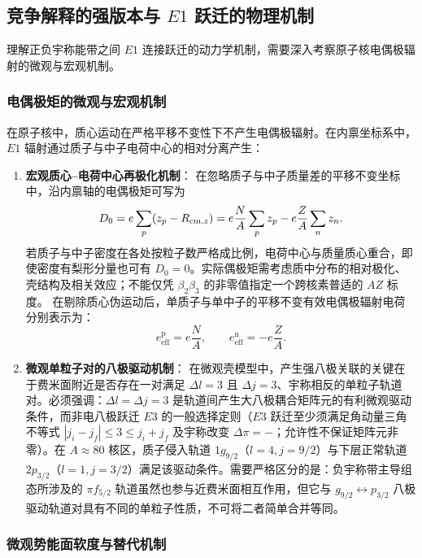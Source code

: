 \subsection{竞争解释的强版本与 $E1$ 跃迁的物理机制}\label{sec:4-5-4}

理解正负宇称能带之间 $E1$ 连接跃迁的动力学机制，需要深入考察原子核电偶极辐射的微观与宏观机制。

\subsubsection{电偶极矩的微观与宏观机制}

在原子核中，质心运动在严格平移不变性下不产生电偶极辐射。在内禀坐标系中，$E1$ 辐射通过质子与中子电荷中心的相对分离产生：
\begin{enumerate}
\item \textbf{宏观质心--电荷中心再极化机制}：
在忽略质子与中子质量差的平移不变坐标中，沿内禀轴的电偶极矩可写为
\begin{equation}\label{eq:4-5-myers-dipole}
D_0=e\sum_{p}(z_p-R_{{\rm cm},z})
=e\frac{N}{A}\sum_p z_p-e\frac{Z}{A}\sum_n z_n.
\end{equation}
若质子与中子密度在各处按粒子数严格成比例，电荷中心与质量质心重合，即使密度有梨形分量也可有 $D_0=0$。实际偶极矩需考虑质中分布的相对极化、壳结构及相关效应；不能仅凭 $\beta_2\beta_3$ 的非零值指定一个跨核素普适的 $AZ$ 标度。
在剔除质心伪运动后，单质子与单中子的平移不变有效电偶极辐射电荷分别表示为：
\begin{equation}\label{eq:4-5-effective-charge}
e_{\text{eff}}^{\text{p}} = e \frac{N}{A}, \qquad e_{\text{eff}}^{\text{n}} = -e \frac{Z}{A}.
\end{equation}
\item \textbf{微观单粒子对的八极驱动机制}：
在微观壳模型中，产生强八极关联的关键在于费米面附近是否存在一对满足 $\Delta l = 3$ 且 $\Delta j = 3$、宇称相反的单粒子轨道对。必须强调：$\Delta l = \Delta j = 3$ 是轨道间产生大八极耦合矩阵元的有利微观驱动条件，而非电八极跃迁 $E3$ 的一般选择定则（$E3$ 跃迁至少须满足角动量三角不等式 $|j_i - j_f| \le 3 \le j_i + j_f$ 及宇称改变 $\Delta\pi=-$；允许性不保证矩阵元非零）。在 $A \approx 80$ 核区，质子侵入轨道 $1g_{9/2}$（$l=4, j=9/2$）与下层正常轨道 $2p_{3/2}$（$l=1, j=3/2$）满足该驱动条件。需要严格区分的是：负宇称带主导组态所涉及的 $\pi f_{5/2}$ 轨道虽然也参与近费米面相互作用，但它与 $g_{9/2} \leftrightarrow p_{3/2}$ 八极驱动轨道对具有不同的单粒子性质，不可将二者简单合并等同。
\end{enumerate}

\subsubsection{微观势能面软度与替代机制}

